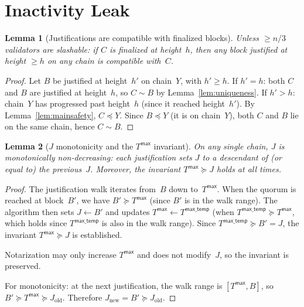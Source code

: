 \ifx\litemode\undefined\documentclass{article}\fi
\theoremstyle{plain}
\newtheorem{lemma}{Lemma}
\theoremstyle{definition}
\theoremstyle{remark}
\begin{document}
\section{Inactivity Leak}

\begin{lemma}[Justifications are compatible with finalized blocks]\label{lem:justcompat}
Unless $\geq n/3$ validators are slashable: if $C$ is finalized at height~$h$, then any block justified at height $\geq h$ on any chain is compatible with~$C$.
\end{lemma}

\begin{proof}
Let $B$ be justified at height~$h'$ on chain~$Y$, with $h' \geq h$.
If $h' = h$: both $C$ and $B$ are justified at height~$h$, so $C \sim B$ by Lemma~\ref{lem:uniqueness}.
If $h' > h$: chain~$Y$ has progressed past height~$h$ (since it reached height~$h'$).
By Lemma~\ref{lem:mainsafety}, $C \preceq Y$.
Since $B \preceq Y$ (it is on chain~$Y$), both $C$ and $B$ lie on the same chain, hence $C \sim B$.
\end{proof}

\begin{lemma}[$J$ monotonicity and the $T^\mathsf{max}$ invariant]\label{lem:jmono}
On any single chain, $J$ is monotonically non-decreasing: each justification sets $J$ to a descendant of (or equal to) the previous~$J$.
Moreover, the invariant $T^\mathsf{max} \succeq J$ holds at all times.
\end{lemma}

\begin{proof}
The justification walk iterates from~$B$ down to~$T^\mathsf{max}$.
When the quorum is reached at block~$B'$, we have $B' \succeq T^\mathsf{max}$ (since $B'$ is in the walk range).
The algorithm then sets $J \gets B'$ and updates $T^\mathsf{max} \gets T^\mathsf{max\_temp}$ (when $T^\mathsf{max\_temp} \succeq T^\mathsf{max}$, which holds since $T^\mathsf{max\_temp}$ is also in the walk range).
Since $T^\mathsf{max\_temp} \succeq B' = J$, the invariant $T^\mathsf{max} \succeq J$ is established.

Notarization may only increase $T^\mathsf{max}$ and does not modify~$J$, so the invariant is preserved.

For monotonicity: at the next justification, the walk range is $[T^\mathsf{max}, B]$, so $B' \succeq T^\mathsf{max} \succeq J_{\mathrm{old}}$.
Therefore $J_{\mathrm{new}} = B' \succeq J_{\mathrm{old}}$.
\end{proof}
\end{document}
